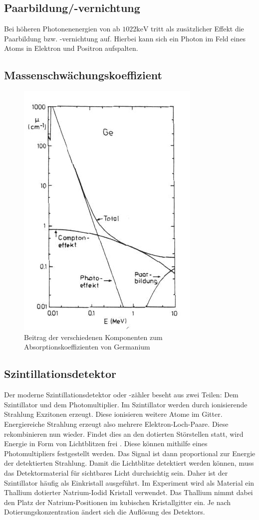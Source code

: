 \documentclass[
	parskip=half,10pt,
	numbers= noenddot, %
	toc=flat, %
	oneside,
	twocolumn,
	]{scrartcl}
\begin{document}
\subsection{Paarbildung/-vernichtung}

Bei höheren Photonenenergien von ab $1022 \si{\kilo \electronvolt}$ tritt als zusätzlicher Effekt die Paarbildung bzw. -vernichtung auf. Hierbei kann sich ein Photon 
im Feld eines Atoms in Elektron und Positron aufspalten. 


\subsection{Massenschwächungskoeffizient}

\begin{figure}[h]
\centering
\includegraphics[width=.4\textwidth]{images/absorption.pdf}
\caption{Beitrag der verschiedenen Komponenten zum Absorptionskoeffizienten von Germanium \cite{schatz}}
\label{fig:absorption_2}
\end{figure}

\subsection{Szintillationsdetektor}

Der moderne Szintillationsdetektor oder -zähler beseht aus zwei Teilen: Dem Szintillator und dem Photomultiplier. Im Szintillator werden durch ionisierende Strahlung 
Exzitonen erzeugt. Diese ionisieren weitere Atome im Gitter. Energiereiche Strahlung erzeugt also mehrere Elektron-Loch-Paare. Diese rekombinieren nun wieder. 
Findet dies an den dotierten Störstellen statt, wird Energie in Form von Lichtblitzen frei \cite{kleinknecht}. Diese können mithilfe eines Photomultipliers 
festgestellt werden. Das Signal ist dann proportional zur Energie der detektierten Strahlung. Damit die Lichtblitze detektiert werden können, muss das Detektormaterial 
für sichtbares Licht durchsichtig sein. Daher ist der Szintillator 
häufig als Einkristall ausgeführt. Im Experiment wird als Material ein Thallium dotierter Natrium-Iodid Kristall verwendet. Das Thallium nimmt dabei den Platz der 
Natrium-Positionen im kubischen Kristallgitter ein. Je nach Dotierungskonzentration ändert sich die Auflösung des Detektors. 
\end{document}
